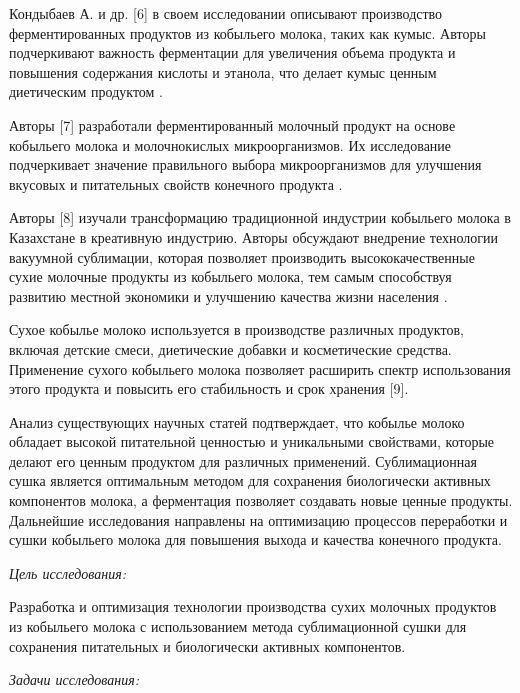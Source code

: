 \begin{multicols}{2}
Кондыбаев А. и др. {[}6{]} в своем исследовании описывают производство
ферментированных продуктов из кобыльего молока, таких как кумыс. Авторы
подчеркивают важность ферментации для увеличения объема продукта и
повышения содержания кислоты и этанола, что делает кумыс ценным
диетическим продуктом .

Авторы {[}7{]} разработали ферментированный молочный продукт на основе
кобыльего молока и молочнокислых микроорганизмов. Их исследование
подчеркивает значение правильного выбора микроорганизмов для улучшения
вкусовых и питательных свойств конечного продукта .

Авторы {[}8{]} изучали трансформацию традиционной индустрии кобыльего
молока в Казахстане в креативную индустрию. Авторы обсуждают внедрение
технологии вакуумной сублимации, которая позволяет производить
высококачественные сухие молочные продукты из кобыльего молока, тем
самым способствуя развитию местной экономики и улучшению качества жизни
населения .

Сухое кобылье молоко используется в производстве различных продуктов,
включая детские смеси, диетические добавки и косметические средства.
Применение сухого кобыльего молока позволяет расширить спектр
использования этого продукта и повысить его стабильность и срок хранения
{[}9{]}.

Анализ существующих научных статей подтверждает, что кобылье молоко
обладает высокой питательной ценностью и уникальными свойствами, которые
делают его ценным продуктом для различных применений. Сублимационная
сушка является оптимальным методом для сохранения биологически активных
компонентов молока, а ферментация позволяет создавать новые ценные
продукты. Дальнейшие исследования направлены на оптимизацию процессов
переработки и сушки кобыльего молока для повышения выхода и качества
конечного продукта.

\emph{Цель исследования:}

Разработка и оптимизация технологии производства сухих молочных
продуктов из кобыльего молока с использованием метода сублимационной
сушки для сохранения питательных и биологически активных компонентов.

\emph{Задачи исследования:}


\end{multicols}
